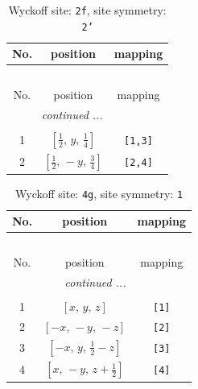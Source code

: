 \documentclass[fleqn,8pt]{jsarticle}
\begin{document}
\renewcommand{\arraystretch}{1.2}
\begin{longtable}{ccc}
\caption{Wyckoff site: {\tt 2f}, site symmetry: {\tt 2'}}
 \\
 \hline \hline
No. & position & mapping \\ \hline \endfirsthead

\multicolumn{2}{l}{\tablename\ \thetable{}} \\
 \hline \hline
No. & position & mapping \\ \hline \endhead

 \hline \hline
\multicolumn{2}{r}{\footnotesize\it continued ...} \\ \endfoot

 \hline \hline
\multicolumn{2}{r}{} \\ \endlastfoot

1 & $\left[ \frac{1}{2},\, y,\, \frac{1}{4} \right]$ & {\tt [1,3]} \\ \hline
2 & $\left[ \frac{1}{2},\, - y,\, \frac{3}{4} \right]$ & {\tt [2,4]} \\
\end{longtable}
\renewcommand{\arraystretch}{1.2}
\begin{longtable}{ccc}
\caption{Wyckoff site: {\tt 4g}, site symmetry: {\tt 1}}
 \\
 \hline \hline
No. & position & mapping \\ \hline \endfirsthead

\multicolumn{2}{l}{\tablename\ \thetable{}} \\
 \hline \hline
No. & position & mapping \\ \hline \endhead

 \hline \hline
\multicolumn{2}{r}{\footnotesize\it continued ...} \\ \endfoot

 \hline \hline
\multicolumn{2}{r}{} \\ \endlastfoot

1 & $\left[ x,\, y,\, z \right]$ & {\tt [1]} \\ \hline
2 & $\left[ - x,\, - y,\, - z \right]$ & {\tt [2]} \\ \hline
3 & $\left[ - x,\, y,\, \frac{1}{2} - z \right]$ & {\tt [3]} \\ \hline
4 & $\left[ x,\, - y,\, z + \frac{1}{2} \right]$ & {\tt [4]} \\
\end{longtable}
\end{document}
